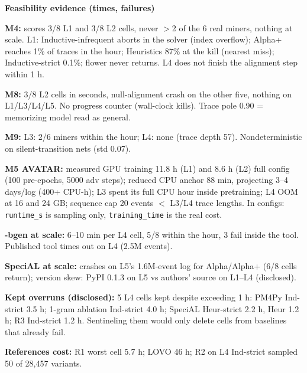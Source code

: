 \documentclass[10pt]{article}
\newcommand{\hdr}[1]{\vspace{5pt}\noindent\textcolor{hd}{\textbf{\large #1}}\par\vspace{2pt}}
\newcommand{\kv}[2]{\noindent\textbf{#1} #2\par}
\begin{document}
\hdr{Feasibility evidence (times, failures)}
\kv{M4:}{scores 3/8 L1 and 3/8 L2 cells, never $>$2 of the 6 real miners, nothing at scale. L1: Inductive-infrequent aborts in the solver (index overflow); Alpha+ reaches 1\% of traces in the hour; Heuristics 87\% at the kill (nearest miss); Inductive-strict 0.1\%; flower never returns. L4 does not finish the alignment step within 1 h.}
\kv{M8:}{3/8 L2 cells in seconds, null-alignment crash on the other five, nothing on L1/L3/L4/L5. No progress counter (wall-clock kills). Trace pole 0.90 = memorizing model read as general.}
\kv{M9:}{L3: 2/6 miners within the hour; L4: none (trace depth 57). Nondeterministic on silent-transition nets (std 0.07).}
\kv{M5 AVATAR:}{measured GPU training 11.8 h (L1) and 8.6 h (L2) full config (100 pre-epochs, 5000 adv steps); reduced CPU anchor 88 min, projecting 3--4 days/log (400+ CPU-h); L3 spent its full CPU hour inside pretraining; L4 OOM at 16 and 24 GB; sequence cap 20 events $<$ L3/L4 trace lengths. In configs: \texttt{runtime\_s} is sampling only, \texttt{training\_time} is the real cost.}
\kv{-bgen at scale:}{6--10 min per L4 cell, 5/8 within the hour, 3 fail inside the tool. Published tool times out on L4 (2.5M events).}
\kv{SpeciAL at scale:}{crashes on L5's 1.6M-event log for Alpha/Alpha+ (6/8 cells return); version skew: PyPI 0.1.3 on L5 vs authors' source on L1--L4 (disclosed).}
\kv{Kept overruns (disclosed):}{5 L4 cells kept despite exceeding 1 h: PM4Py Ind-strict 3.5 h; 1-gram ablation Ind-strict 4.0 h; SpeciAL Heur-strict 2.2 h, Heur 1.2 h; R3 Ind-strict 1.2 h. Sentineling them would only delete cells from baselines that already fail.}
\kv{References cost:}{R1 worst cell 5.7 h; LOVO 46 h; R2 on L4 Ind-strict sampled 50 of 28{,}457 variants.}
\end{document}
